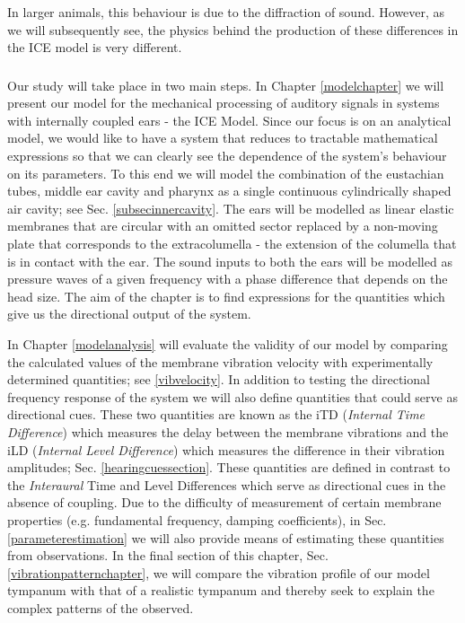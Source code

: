 In larger animals, this behaviour is
due to the diffraction of sound. However, as we will
subsequently see, the physics behind the production of these differences in the ICE model is very different.
\subsubsection*{}
Our study will take place in two main steps. In Chapter \ref{modelchapter} we will
present our model for the mechanical processing of auditory signals in systems with internally coupled ears - the ICE Model.
Since our focus is on an analytical model, we would like to have a system that reduces to tractable mathematical expressions
so that we can clearly see the dependence of the system's behaviour on its parameters. To this end we will model the 
combination of the eustachian tubes, middle ear cavity and pharynx as a single continuous cylindrically shaped air cavity; see
Sec. \ref{subsecinnercavity}. The ears will be modelled as linear elastic membranes that are circular with an omitted sector replaced
by a non-moving plate
that corresponds to the extracolumella - the extension of the columella that is in contact with the ear. The
sound inputs to both the ears will be modelled as pressure waves of a given frequency with a phase difference that depends on the 
head size. The aim of the chapter is to find expressions for the quantities which give us the directional output of the system.

In Chapter \ref{modelanalysis} will evaluate the validity of our model
by comparing the calculated values of the membrane vibration velocity with experimentally determined quantities; 
see \ref{vibvelocity}. In addition to testing the directional frequency
response of the system we will also define quantities that could serve as directional cues. These two quantities are known
as the iTD (\emph{Internal Time Difference}) which measures the delay between the membrane vibrations and the iLD (\emph{Internal Level
Difference}) which measures the difference in their vibration amplitudes; Sec. \ref{hearingcuessection}. These quantities are defined in contrast to the
\emph{Interaural} Time and Level  Differences which serve as directional cues in the absence of coupling. Due to the difficulty of measurement of certain membrane
properties (e.g. fundamental frequency, damping coefficients), in Sec. \ref{parameterestimation} we will also provide means of estimating these quantities from observations.
In the final section of this chapter, Sec. \ref{vibrationpatternchapter}, we will compare the vibration profile of our model tympanum with that of a realistic tympanum and thereby
seek to explain the complex patterns of the observed.

